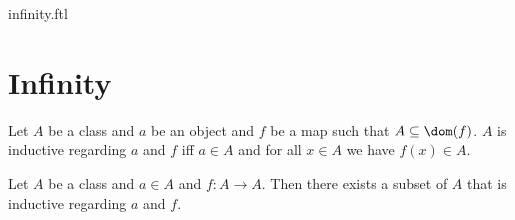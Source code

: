 \documentclass{naproche-library}
\begin{document}
\begin{smodule}{infinity.ftl}

  \section{Infinity}

  \begin{definition}[forthel,id=FOUNDATIONS_10_298374925738210,printid]
    Let $A$ be a class and $a$ be an object and $f$ be a map such that $A \subseteq \dom(f)$.
    $A$ is inductive regarding $a$ and $f$ iff $a \in A$ and for all $x \in A$ we have $f(x) \in A$.
  \end{definition}
  
  \begin{axiom}[forthel,title=Infinity Axiom,id=FOUNDATIONS_10_367388832825344,printid]
    Let $A$ be a class and $a \in A$ and $f : A \to A$.
    Then there exists a subset of $A$ that is inductive regarding $a$ and $f$.
  \end{axiom}
\end{smodule}
\end{document}
